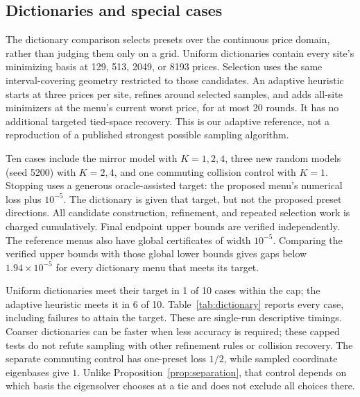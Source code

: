 \documentclass[11pt]{article}
\begin{document}
\subsection{Dictionaries and special cases}
The dictionary comparison selects presets over the continuous price domain,
rather than judging them only on a grid. Uniform dictionaries contain
every site's minimizing basis at 129, 513, 2049, or 8193 prices. Selection
uses the same interval-covering geometry restricted to those candidates.
An adaptive heuristic starts at three prices per site, refines around selected
samples, and adds all-site minimizers at the menu's current worst price,
for at most 20 rounds. It has no additional targeted tied-space recovery.
This is our adaptive reference, not a reproduction of a published strongest
possible sampling algorithm.

Ten cases include the mirror model with $K=1,2,4$, three new random models
(seed 5200) with $K=2,4$, and one commuting collision control with $K=1$.
Stopping uses a generous oracle-assisted target: the proposed menu's
numerical loss plus $10^{-5}$. The dictionary is given that target, but
not the proposed preset directions. All candidate construction, refinement,
and repeated selection work is charged cumulatively. Final endpoint upper
bounds are verified independently. The reference menus also have global
certificates of width $10^{-5}$. Comparing the verified upper bounds with
those global lower bounds gives gaps below $1.94\times10^{-5}$ for every
dictionary menu that meets its target.

Uniform dictionaries meet their target in 1 of 10 cases within the cap;
the adaptive heuristic meets it in 6 of 10. Table~\ref{tab:dictionary}
reports every case, including failures to attain the target. These are
single-run descriptive timings. Coarser dictionaries can be faster when
less accuracy is required; these capped tests do not refute sampling with
other refinement rules or collision recovery. The separate commuting control
has one-preset loss $1/2$, while sampled coordinate eigenbases give $1$.
Unlike Proposition~\ref{prop:separation}, that control depends on which
basis the eigensolver chooses at a tie and does not exclude all choices there.

\begin{table}[t]\centering\small
\caption{Dictionary screen: cumulative seconds and target attainment at the
stopping stage or cap. ``No'' is failure to reach the accuracy target, not a
software failure. Verification time is excluded for all methods.}
\label{tab:dictionary}
\end{table}
\end{document}
